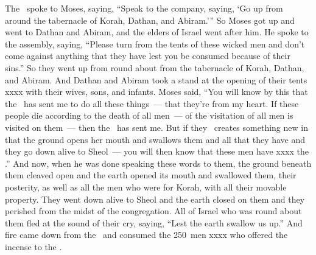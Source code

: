 \begin{inparaenum}
   The \lord\ spoke to Moses, saying,%
   ``Speak to the company, saying, `Go up from around the tabernacle of Korah, Dathan, and Abiram.'\thinspace''%
   So Moses got up and went to Dathan and Abiram, and the elders of Israel went after him.%
   He spoke to the assembly, saying, ``Please turn from the tents of these wicked men and don't come against anything that they have lest you be consumed because of their sins.''%
   So they went up from round about from the tabernacle of Korah, Dathan, and Abiram. And Dathan and Abiram took a stand at the opening of their tents xxxx with their wives, sons, and infants.%
   Moses said, ``You will know by this that the \lord\ has sent me to do all these things~--- that they're from my heart.%
   If these people die according to the death of all men~--- of the visitation of all men is visited on them~--- then the \lord\ has sent me.%
   But if they \lord\ creates something new in that the ground opens her mouth and swallows them and all that they have and they go down alive to Sheol~--- you will then know that these men have xxxx the \lord.''%
   And now, when he was done speaking these words to them, the ground beneath them cleaved open\understood%
   and the earth opened its mouth and swallowed them, their posterity, as well as all the men who were for Korah, with all their movable property.%
   They went down alive to Sheol and the earth closed on them and they perished from the midst of the congregation.%
   All of Israel who was round about them fled at the sound of their cry, saying, ``Lest the earth swallow us up.''%
   And fire came down from the \lord\ and consumed the 250~men xxxx who offered the incense to the \lord.%
\end{inparaenum}
